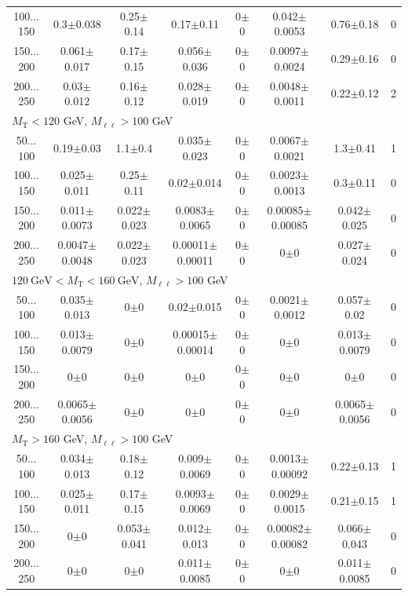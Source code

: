 \begin{landscape}
\begin{table}
\begin{center}
\begin{tabular}{| c | c c c c c c c | }
100$\dots$150&0.3$\pm$0.038&0.25$\pm$0.14&0.17$\pm$0.11&0$\pm$0&0.042$\pm$0.0053&0.76$\pm$0.18&0\\
150$\dots$200&0.061$\pm$0.017&0.17$\pm$0.15&0.056$\pm$0.036&0$\pm$0&0.0097$\pm$0.0024&0.29$\pm$0.16&0\\
200$\dots$250&0.03$\pm$0.012&0.16$\pm$0.12&0.028$\pm$0.019&0$\pm$0&0.0048$\pm$0.0011&0.22$\pm$0.12&2\\
\hline\hline
\multicolumn{8}{l}{$M_{\text{T}} < 120$ GeV, $M_{\ell\ell} > 100$ GeV}\\\hline\hline
50$\dots$100&0.19$\pm$0.03&1.1$\pm$0.4&0.035$\pm$0.023&0$\pm$0&0.0067$\pm$0.0021&1.3$\pm$0.41&1\\
100$\dots$150&0.025$\pm$0.011&0.25$\pm$0.11&0.02$\pm$0.014&0$\pm$0&0.0023$\pm$0.0013&0.3$\pm$0.11&0\\
150$\dots$200&0.011$\pm$0.0073&0.022$\pm$0.023&0.0083$\pm$0.0065&0$\pm$0&0.00085$\pm$0.00085&0.042$\pm$0.025&0\\
200$\dots$250&0.0047$\pm$0.0048&0.022$\pm$0.023&0.00011$\pm$0.00011&0$\pm$0&0$\pm$0&0.027$\pm$0.024&0\\
\hline\hline
\multicolumn{8}{l}{$120~\mathrm{GeV} < M_{\text{T}} < 160~\mathrm{GeV}$, $M_{\ell\ell} > 100$ GeV}\\\hline\hline
50$\dots$100&0.035$\pm$0.013&0$\pm$0&0.02$\pm$0.015&0$\pm$0&0.0021$\pm$0.0012&0.057$\pm$0.02&0\\
100$\dots$150&0.013$\pm$0.0079&0$\pm$0&0.00015$\pm$0.00014&0$\pm$0&0$\pm$0&0.013$\pm$0.0079&0\\
150$\dots$200&0$\pm$0&0$\pm$0&0$\pm$0&0$\pm$0&0$\pm$0&0$\pm$0&0\\
200$\dots$250&0.0065$\pm$0.0056&0$\pm$0&0$\pm$0&0$\pm$0&0$\pm$0&0.0065$\pm$0.0056&0\\
\hline\hline
\multicolumn{8}{l}{$M_{\text{T}} > 160$ GeV, $M_{\ell\ell} > 100$ GeV}\\\hline\hline
50$\dots$100&0.034$\pm$0.013&0.18$\pm$0.12&0.009$\pm$0.0069&0$\pm$0&0.0013$\pm$0.00092&0.22$\pm$0.13&1\\
100$\dots$150&0.025$\pm$0.011&0.17$\pm$0.15&0.0093$\pm$0.0069&0$\pm$0&0.0029$\pm$0.0015&0.21$\pm$0.15&1\\
150$\dots$200&0$\pm$0&0.053$\pm$0.041&0.012$\pm$0.013&0$\pm$0&0.00082$\pm$0.00082&0.066$\pm$0.043&0\\
200$\dots$250&0$\pm$0&0$\pm$0&0.011$\pm$0.0085&0$\pm$0&0$\pm$0&0.011$\pm$0.0085&0\\
\hline\hline
\end{tabular}
\end{center}

\end{table}
\end{landscape}

